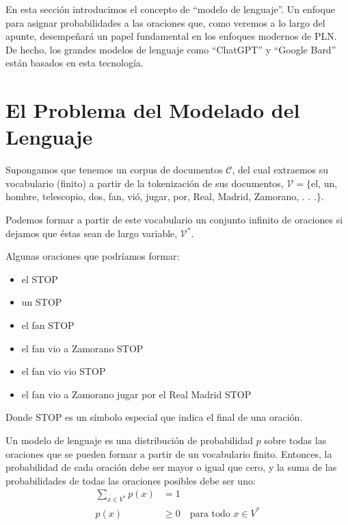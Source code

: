 
En esta sección introducimos el concepto de ``modelo de lenguaje''. Un enfoque para asignar probabilidades a las oraciones que, como veremos a lo largo del apunte, desempeñará un papel fundamental en los enfoques modernos de PLN. De hecho, los grandes modelos de lenguaje como ``ChatGPT'' y ``Google Bard'' están basados en esta tecnología.

\section{El Problema del Modelado del Lenguaje}
Supongamos que tenemos un corpus de documentos $\mathcal{C}$, del cual extraemos su vocabulario (finito) a partir de la tokenización de sus documentos, $\mathcal{V} = \{$el, un, hombre, telescopio, dos, fan, vió, jugar, por, Real, Madrid, Zamorano, . . .$\}$.

Podemos formar a partir de este vocabulario un conjunto infinito de oraciones si dejamos que éstas sean de largo variable, $\mathcal{V}^*$. 

\begin{example}
Algunas oraciones que podríamos formar:
\begin{itemize}
\item el STOP
\item un STOP
\item el fan STOP
\item el fan vio a Zamorano STOP
\item el fan vio vio STOP
\item el fan vio a Zamorano jugar por el Real Madrid STOP
\end{itemize}

Donde STOP es un símbolo especial que indica el final de una oración.  
\end{example}

\begin{definition}
Un modelo de lenguaje es una distribución de probabilidad $p$ sobre todas las oraciones que se pueden formar a partir de un vocabulario finito. Entonces, la probabilidad de cada oración debe ser mayor o igual que cero, y la suma de las probabilidades de todas las oraciones posibles debe ser uno: 
\begin{align*}
\sum_{x\in V^*} p(x) &= 1 \\
p(x) &\geq 0 \quad \text{para todo } x \in V^*
\end{align*}
\end{definition}


